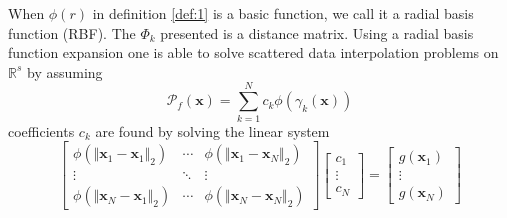                   When $\phi(r)$ in definition \ref{def:1} is a basic function, we call it a radial basis function (RBF).
                  The $\Phi_k$ presented is a distance matrix. Using a radial basis function expansion
                  one is able to solve scattered data interpolation problems on $\mathbb{R}^s$ by assuming
                  \begin{equation}\label{eq:inter}
                      \mathcal{P}_f(\mathbf{x})=\sum_{k=1}^N c_k\phi(\gamma_k(\mathbf{x}))
                  \end{equation}
                  coefficients $c_k$ are found by solving the linear system
                  \begin{equation} \label{eq:dist}
                      \begin{bmatrix}
                          \phi(\Vert \mathbf{x}_1-\mathbf{x}_1\Vert_2) & \cdots & \phi(\Vert \mathbf{x}_1-\mathbf{x}_N\Vert_2) \\
                          \vdots & \ddots & \vdots \\
                          \phi(\Vert \mathbf{x}_N-\mathbf{x}_1\Vert_2) & \cdots & \phi(\Vert \mathbf{x}_N-\mathbf{x}_N\Vert_2)
                      \end{bmatrix}
                      \begin{bmatrix}
                          c_1 \\
                          \vdots \\
                          c_N
                      \end{bmatrix} =
                      \begin{bmatrix}
                          g(\mathbf{x}_1) \\
                          \vdots \\
                          g(\mathbf{x}_N)
                      \end{bmatrix}
                  \end{equation}

